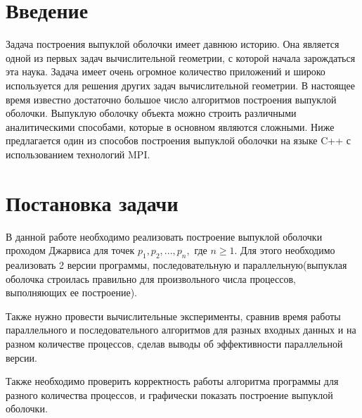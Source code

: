 \documentclass{report}
\begin{document}
\setcounter{page}{2}

\tableofcontents
\newpage

\section*{Введение}
Задача построения выпуклой оболочки имеет давнюю историю. Она является одной из первых задач вычислительной геометрии, с которой начала зарождаться эта наука.  Задача имеет очень огромное количество приложений и широко используется для решения других задач вычислительной геометрии. В настоящее время известно достаточно большое число алгоритмов построения выпуклой оболочки. Выпуклую оболочку объекта можно строить различными аналитическими способами, которые в основном являются сложными. Ниже предлагается один из способов построения выпуклой оболочки на языке C++ с использованием технологий MPI.
\newpage

\section*{Постановка задачи}
В данной работе необходимо реализовать построение выпуклой оболочки проходом Джарвиса для точек $p_1, p_2, ..., p_n,$ где $n \ge 1$. Для этого необходимо реализовать 2 версии программы, последовательную и параллельную(выпуклая оболочка строилась правильно для произвольного числа процессов, выполняющих ее построение).
\par
Также нужно провести вычислительные эксперименты, сравнив время работы параллельного и последовательного алгоритмов для разных входных данных и на разном количестве процессов, сделав выводы об эффективности параллельной версии.
\par
Также необходимо проверить корректность работы алгоритма программы для разного количества процессов, и графически показать построение выпуклой оболочки. 
\newpage

\end{document}
